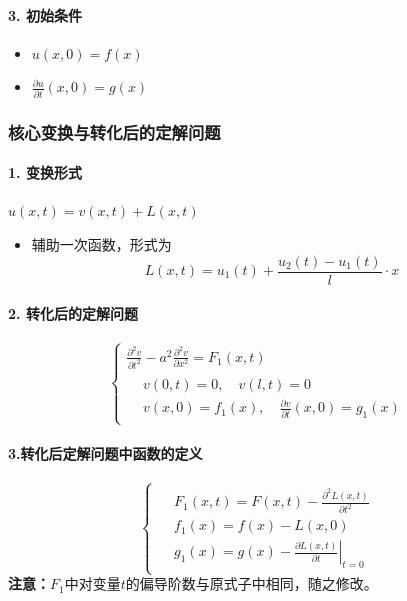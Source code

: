 \documentclass{article}
\begin{document}
	\paragraph{3. 初始条件}
	\begin{itemize}
		\item $ u(x, 0) = f(x) $
		\item $ \frac{\partial u}{\partial t}(x, 0) = g(x) $
	\end{itemize}
	
	\subsubsection{核心变换与转化后的定解问题}
	
	\paragraph{1. 变换形式}
	$ u(x, t) = v(x, t) + L(x, t) $
	\begin{itemize}
		\item 辅助一次函数，形式为 $$ L(x, t) = u_1(t) + \frac{u_2(t) - u_1(t)}{l} \cdot x $$
	\end{itemize}
	
	\paragraph{2. 转化后的定解问题}
	\[
	\begin{cases}
		\frac{\partial^2 v}{\partial t^2} - a^2 \frac{\partial^2 v}{\partial x^2} = F_1(x, t) \\[6pt]
		\begin{aligned}
			& v(0, t) = 0, \quad v(l, t) = 0 \\[6pt]
			& v(x, 0) = f_1(x), \quad \frac{\partial v}{\partial t}(x, 0) = g_1(x)
		\end{aligned}
	\end{cases}
	\]
	
	\paragraph{3.转化后定解问题中函数的定义}
	\[
	\begin{cases}
		\begin{aligned}
			& F_1(x, t) = F(x, t) - \frac{\partial^2 L(x, t)}{\partial t^2}  \\[6pt]
			& f_1(x) = f(x) - L(x, 0)  \\[6pt]
			& g_1(x) = g(x) - \left. \frac{\partial L(x, t)}{\partial t} \right|_{t=0} 
		\end{aligned}
	\end{cases}
	\]
	\textbf{注意：}$F_1$中对变量$t$的偏导阶数与原式子中相同，随之修改。
	
\end{document}
